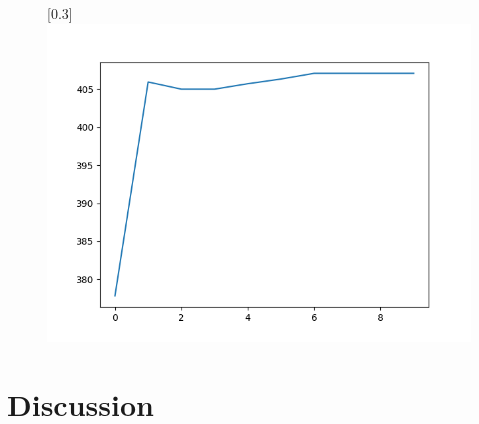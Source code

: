 \documentclass[11pt]{article} %
\begin{document}
\begin{figure}[ht]
{	}
	[0.3\linewidth]{
		\includegraphics[scale=0.3]{PSO0.5_2_2.png}
	}
\end{figure}

\section{Discussion}
\end{document}
